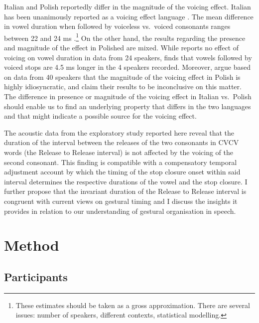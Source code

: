 \documentclass[preprint]{JASAnew}
\begin{document}
Italian and Polish reportedly differ in the magnitude of the voicing
effect. Italian has been unanimously reported as a voicing effect
language \citep{caldognetto1979, farnetani1986, esposito2002}. The mean
difference in vowel duration when followed by voiceless vs.~voiced
consonants ranges between 22 and 24 ms \citep[with longer vowels
followed by voiced
consonants,][]{farnetani1986, esposito2002}.\footnote{These estimates should be taken as a gross approximation.
There are several issues: number of speakers, different contexts, statistical modelling.}
On the other hand, the results regarding the presence and magnitude of
the effect in Polished are mixed. While \citet{keating1984} reports no
effect of voicing on vowel duration in data from 24 speakers,
\citet{nowak2006} finds that vowels followed by voiced stops are 4.5 ms
longer in the 4 speakers recorded. Moreover, \citet{malisz2008} argue
based on data from 40 speakers that the magnitude of the voicing effect
in Polish is highly idiosyncratic, and claim their results to be
inconclusive on this matter. The difference in presence or magnitude of
the voicing effect in Italian vs.~Polish should enable us to find an
underlying property that differs in the two languages and that might
indicate a possible source for the voicing effect.

The acoustic data from the exploratory study reported here reveal that
the duration of the interval between the releases of the two consonants
in CVCV words (the Release to Release interval) is not affected by the
voicing of the second consonant. This finding is compatible with a
compensatory temporal adjustment account by which the timing of the stop
closure onset within said interval determines the respective durations
of the vowel and the stop closure. I further propose that the invariant
duration of the Release to Release interval is congruent with current
views on gestural timing \citep{goldstein2014} and I discuss the
insights it provides in relation to our understanding of gestural
organisation in speech.

\hypertarget{method}{%
\section{Method}\label{method}}

\label{s:method}

\hypertarget{participants}{%
\subsection{Participants}\label{participants}}
\end{document}

